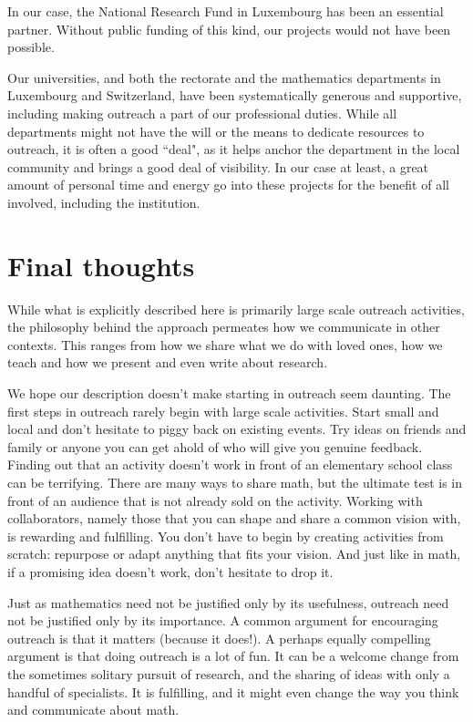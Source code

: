\documentclass{notices}
\begin{document}
In our case, the National Research Fund in Luxembourg has been an essential partner. Without public funding of this kind, our projects would not have been possible.

Our universities, and both the rectorate and the mathematics departments in Luxembourg and Switzerland, have been systematically generous and supportive, including making outreach a part of our professional duties. While all departments might not have the will or the means to dedicate resources to outreach, it is often a good ``deal", as it helps anchor the department in the local community and brings a good deal of visibility. In our case at least, a great amount of personal time and energy go into these projects for the benefit of all involved, including the institution.

 \section*{Final thoughts}
  
While what is explicitly described here is primarily large scale outreach activities, the philosophy behind the approach permeates how we communicate in other contexts. This ranges from how we share what we do with loved ones, how we teach and how we present and even write about research.

We hope our description doesn't make starting in outreach seem daunting. The first steps in outreach rarely begin with large scale activities. Start small and local and don't hesitate to piggy back on existing events. Try ideas on friends and family or anyone you can get ahold of who will give you genuine feedback. Finding out that an activity doesn't work in front of an elementary school class can be terrifying. There are many ways to share math, but the ultimate test is in front of an audience that is not already sold on the activity.  Working with collaborators, namely those that you can shape and share a common vision with, is rewarding and fulfilling. You don't have to begin by creating activities from scratch: repurpose or adapt anything that fits your vision. And just like in math, if a promising idea doesn't work, don't hesitate to drop it. 

Just as mathematics need not be justified only by its usefulness, outreach need not be justified only by its importance. A common argument for encouraging outreach is that it matters (because it does!).  A perhaps equally compelling argument is that doing outreach is a lot of fun. It can be a welcome change from the sometimes solitary pursuit of research, and the sharing of ideas with only a handful of specialists. It is fulfilling, and it might even change the way you think and communicate about math. 
\end{document}
